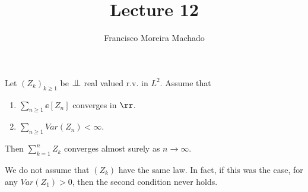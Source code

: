 \documentclass[../main.tex]{subfiles}
\author{Francisco Moreira Machado}
\title{Lecture 12}
\begin{document}
  \begin{theorem}
      Let $(Z_k)_{k \geq 1}$ be $\perp\!\!\!\!\,\perp$ real valued r.v. in $L^2$.
      Assume that
      \begin{enumerate}
        \item $\sum_{n \geq 1} \ee[Z_n]$ converges in $\rr$.
        \item $\sum_{n \geq 1} Var(Z_n) < \infty$.
      \end{enumerate}
      Then $\sum_{k = 1}^n Z_k$ converges almost surely as $n \to \infty$.
  \end{theorem}
  \begin{remark}
    We do not assume that $(Z_k)$ have the same law. In fact, if this was the
    case, for any $Var(Z_1) > 0$, then the second condition never holds.
  \end{remark}
\end{document}
